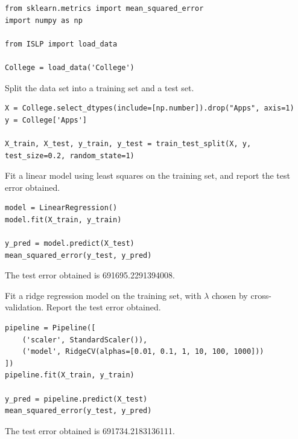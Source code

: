 \documentclass{article}
\begin{document}
\begin{probset}
\begin{prob}
\begin{verbatim}
from sklearn.metrics import mean_squared_error
import numpy as np

from ISLP import load_data

College = load_data('College')
    \end{verbatim}

    \begin{subprobset}
        \begin{subprob}
            Split the data set into a training set and a test set.

            \begin{verbatim}
X = College.select_dtypes(include=[np.number]).drop("Apps", axis=1)
y = College['Apps']

X_train, X_test, y_train, y_test = train_test_split(X, y, test_size=0.2, random_state=1)
            \end{verbatim}
        \end{subprob}

        \begin{subprob}
            Fit a linear model using least squares on the training set, and report the test error obtained.

            \begin{verbatim}
model = LinearRegression()
model.fit(X_train, y_train)

y_pred = model.predict(X_test)
mean_squared_error(y_test, y_pred)
            \end{verbatim}

            \begin{soln}
                The test error obtained is 691695.2291394008.
            \end{soln}
        \end{subprob}

        \begin{subprob}
            Fit a ridge regression model on the training set, with $\lambda$ chosen by cross-validation. Report the test error obtained.

            \begin{verbatim}
pipeline = Pipeline([
    ('scaler', StandardScaler()),
    ('model', RidgeCV(alphas=[0.01, 0.1, 1, 10, 100, 1000]))
])
pipeline.fit(X_train, y_train)

y_pred = pipeline.predict(X_test)
mean_squared_error(y_test, y_pred)
            \end{verbatim}

            \begin{soln}
                The test error obtained is 691734.2183136111.
            \end{soln}
        \end{subprob}


\end{subprobset}
\end{prob}
\end{probset}
\end{document}
